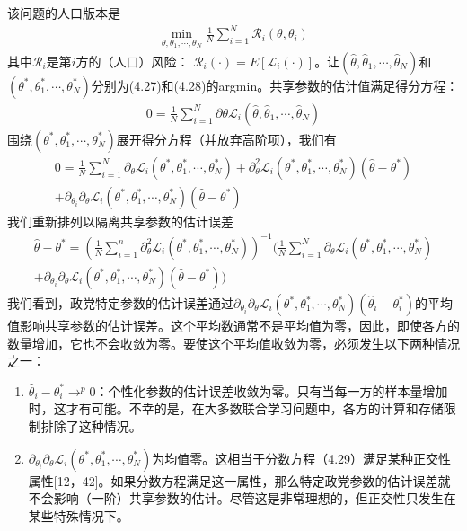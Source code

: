 该问题的人口版本是
\begin{align}\label{eq:4-28}
	\min_{\theta, \theta_{1}, \cdots, \theta_{N}} \frac{1}{N} \sum_{i=1}^{N} \mathcal{R}_{i}(\theta, \theta_{i})
\end{align}
其中$\mathcal{R}_{i}$是第$i$方的（人口）风险： $\mathcal{R}_{i}(\cdot) = E[\mathcal{L}_{i}(\cdot)]$。让$(\hat{\theta}, \hat{\theta}_{1}, \cdots, \hat{\theta}_{N})$和$(\theta^{*}, \theta_{1}^{*}, \cdots, \theta_{N}^{*})$分别为(4.27)和(4.28)的argmin。共享参数的估计值满足得分方程：
\begin{align}
	0 = \frac{1}{N} \sum_{i=1}^{N} \partial{\theta} \mathcal{L}_{i}(\hat{\theta}, \hat{\theta}_{1}, \cdots, \hat{\theta}_{N})
\end{align}
围绕$(\theta^{*}, \theta_{1}^{*}, \cdots, \theta_{N}^{*})$展开得分方程（并放弃高阶项），我们有
\begin{align*}
	0 = \frac{1}{N} \sum_{i=1}^{N} \partial_{\theta} \mathcal{L}_{i}(\theta^{*}, \theta_{1}^{*}, \cdots, \theta_{N}^{*}) + \partial_{\theta}^{2} \mathcal{L}_{i}(\theta^{*}, \theta_{1}^{*}, \cdots, \theta_{N}^{*})(\hat{\theta} - \theta^{*}) \\
	+ \partial_{\theta_{i}}\partial_{\theta} \mathcal{L}_{i} (\theta^{*}, \theta_{1}^{*}, \cdots, \theta_{N}^{*})(\hat{\theta} - \theta^{*})
\end{align*}
我们重新排列以隔离共享参数的估计误差
\begin{align*}
	\hat{\theta} - \theta^{*} = (\frac{1}{N} \sum_{i=1}^{n} \partial_{\theta}^{2} \mathcal{L}_{i}(\theta^{*}, \theta_{1}^{*}, \cdots, \theta_{N}^{*}))^{-1} (\frac{1}{N} \sum_{i=1}^{N} \partial_{\theta} \mathcal{L}_{i}(\theta^{*}, \theta_{1}^{*}, \cdots, \theta_{N}^{*}) \\
	+ \partial_{\theta_{i}}\partial_{\theta} \mathcal{L}_{i} (\theta^{*}, \theta_{1}^{*}, \cdots, \theta_{N}^{*})(\hat{\theta} - \theta^{*}))
\end{align*}
我们看到，政党特定参数的估计误差通过$\partial_{\theta_{i}}\partial_{\theta} \mathcal{L}_{i}(\theta^{*}, \theta_{1}^{*}, \cdots, \theta_{N}^{*})(\hat{\theta}_{i} - \theta_{i}^{*})$的平均值影响共享参数的估计误差。这个平均数通常不是平均值为零，因此，即使各方的数量增加，它也不会收敛为零。要使这个平均值收敛为零，必须发生以下两种情况之一：
\begin{enumerate}
	\item $\hat{\theta}_{i} - \theta_{i}^{*} \rightarrow^{p} 0$：个性化参数的估计误差收敛为零。只有当每一方的样本量增加时，这才有可能。不幸的是，在大多数联合学习问题中，各方的计算和存储限制排除了这种情况。
	\item $\partial_{\theta_{i}}\partial_{\theta} \mathcal{L}_{i}(\theta^{*}, \theta_{1}^{*}, \cdots, \theta_{N}^{*})$为均值零。这相当于分数方程（4.29）满足某种正交性属性[12，42]。如果分数方程满足这一属性，那么特定政党参数的估计误差就不会影响（一阶）共享参数的估计。尽管这是非常理想的，但正交性只发生在某些特殊情况下。
\end{enumerate}

